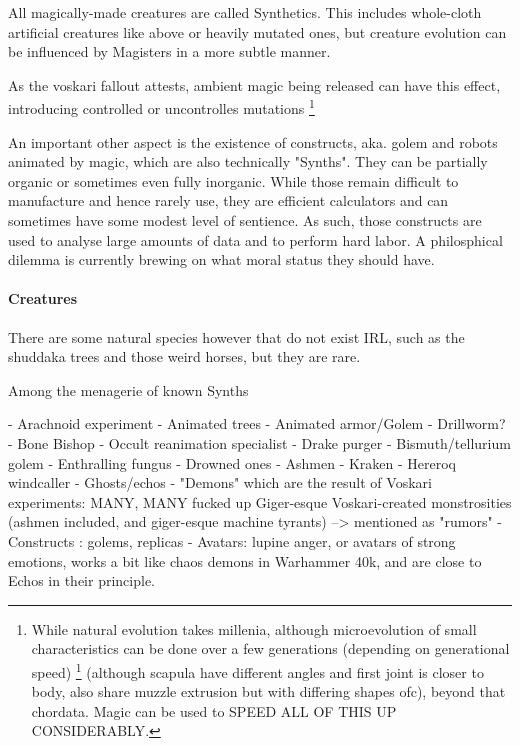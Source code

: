 All magically-made creatures are called Synthetics. This includes whole-cloth artificial creatures like above or heavily mutated ones, but creature evolution can be influenced by Magisters in a more subtle manner.


As the voskari fallout attests, ambient magic being released can have this effect, introducing controlled or uncontrolles mutations \footnote{While natural evolution takes millenia, although microevolution of small characteristics can be done over a few generations (depending on generational speed)
\footnote{Quadrupeds will generally share a bone structure and muscle attachments, traces of which can be seen in fish even. Muscle attachments for the face are cheekbones and lower far mandible} (although scapula have different angles and first joint is closer to body, also share muzzle extrusion but with differing shapes ofc), beyond that chordata. Magic can be used to SPEED ALL OF THIS UP CONSIDERABLY.}

An important other aspect is the existence of constructs, aka. golem and robots animated by magic, which are also technically "Synths". They can be partially organic or sometimes even fully inorganic. While those remain difficult to manufacture and hence rarely use, they are efficient calculators and can sometimes have some modest level of sentience. As such, those constructs are used to analyse large amounts of data and to perform hard labor. A philosphical dilemma is currently brewing on what moral status they should have.







\paragraph{Creatures}


There are some natural species however that do not exist IRL, such as the shuddaka trees and those weird horses, but they are rare.




Among the menagerie of known Synths


- Arachnoid experiment
- Animated trees
- Animated armor/Golem
- Drillworm?
- Bone Bishop
- Occult reanimation specialist
- Drake purger
- Bismuth/tellurium golem
- Enthralling fungus
- Drowned ones
- Ashmen
- Kraken
- Hereroq windcaller
- Ghosts/echos
- "Demons" which are the result of Voskari experiments:	MANY, MANY fucked up Giger-esque Voskari-created monstrosities (ashmen included, and giger-esque machine tyrants) –> mentioned as "rumors"
- Constructs : golems, replicas
- Avatars: lupine anger, or avatars of strong emotions, works a bit like chaos demons in Warhammer 40k, and are close to Echos in their principle.





